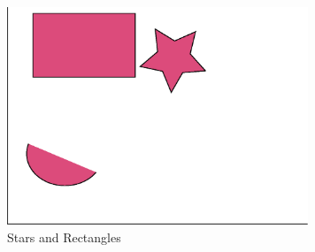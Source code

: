 \begin{figure}[htbp]
\begin{flushright}
\includegraphics[width=9cm,angle=45]{starsandrectangles}
\caption{Stars and Rectangles}
\label{fig:StarsAndRectangles}
\end{flushright}
\end{figure}
